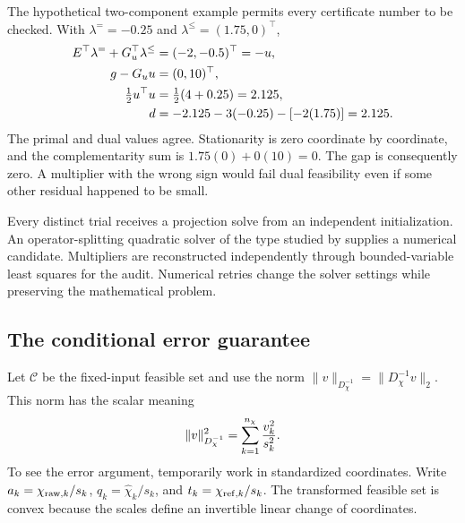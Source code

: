 The hypothetical two-component example permits every certificate number to be checked. With $\lambda^{=}=-0.25$ and $\lambda^\le=(1.75,0)^\top$,
\begin{align}
\equationname{Illustrative cancellation of the stationarity residual}
E^\top\lambda^=+G_u^\top\lambda^\le&=(-2,-0.5)^\top=-u,\\
\equationname{Illustrative inequality slack vector}
g-G_uu&=(0,10)^\top,\\
\equationname{Illustrative value of the primal projection objective}
\tfrac12u^\top u&=\tfrac12(4+0.25)=2.125,\\
\equationname{Illustrative value of the dual projection objective}
d&=-2.125-3(-0.25)-[-2(1.75)]=2.125.
\end{align}
The primal and dual values agree. Stationarity is zero coordinate by coordinate, and the complementarity sum is $1.75(0)+0(10)=0$. The gap is consequently zero. A multiplier with the wrong sign would fail dual feasibility even if some other residual happened to be small.

Every distinct trial receives a projection solve from an independent initialization. An operator-splitting quadratic solver of the type studied by \citet{Stellato2020} supplies a numerical candidate. Multipliers are reconstructed independently through bounded-variable least squares for the audit. Numerical retries change the solver settings while preserving the mathematical problem.

\subsection{The conditional error guarantee}

Let $\mathcal C$ be the fixed-input feasible set and use the norm
$\|v\|_{D_\chi^{-1}}=\|D_\chi^{-1}v\|_2$. This norm has the scalar meaning
\begin{equation}
\equationname{Weighted response norm from coordinate scales}
\|v\|_{D_\chi^{-1}}^2=\sum_{k=1}^{n_\chi}\frac{v_k^2}{s_k^2}.
\end{equation}
To see the error argument, temporarily work in standardized coordinates. Write $a_k=\chi_{{\rm raw},k}/s_k$, $q_k=\widehat\chi_k/s_k$, and $t_k=\chi_{{\rm ref},k}/s_k$. The transformed feasible set is convex because the scales define an invertible linear change of coordinates.

